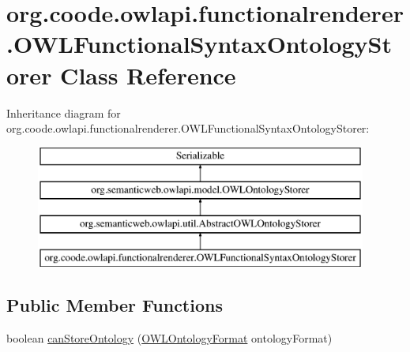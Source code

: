 \hypertarget{classorg_1_1coode_1_1owlapi_1_1functionalrenderer_1_1_o_w_l_functional_syntax_ontology_storer}{\section{org.\-coode.\-owlapi.\-functionalrenderer.\-O\-W\-L\-Functional\-Syntax\-Ontology\-Storer Class Reference}
\label{classorg_1_1coode_1_1owlapi_1_1functionalrenderer_1_1_o_w_l_functional_syntax_ontology_storer}
}
Inheritance diagram for org.\-coode.\-owlapi.\-functionalrenderer.\-O\-W\-L\-Functional\-Syntax\-Ontology\-Storer\-:\begin{figure}[H]
\begin{center}
\leavevmode
\includegraphics[height=4.000000cm]{classorg_1_1coode_1_1owlapi_1_1functionalrenderer_1_1_o_w_l_functional_syntax_ontology_storer}
\end{center}
\end{figure}
\subsection*{Public Member Functions}
\begin{DoxyCompactItemize}
\item 
boolean \hyperlink{classorg_1_1coode_1_1owlapi_1_1functionalrenderer_1_1_o_w_l_functional_syntax_ontology_storer_a921fde9ca25e326c885fe7093b02d2c2}{can\-Store\-Ontology} (\hyperlink{classorg_1_1semanticweb_1_1owlapi_1_1model_1_1_o_w_l_ontology_format}{O\-W\-L\-Ontology\-Format} ontology\-Format)
\end{DoxyCompactItemize}
